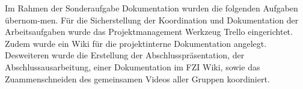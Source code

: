 Im Rahmen der Sonderaufgabe Dokumentation wurden die folgenden Aufgaben übernom-men. Für die Sicherstellung der Koordination und Dokumentation der Arbeitsaufgaben wurde das Projektmanagement Werkzeug Trello eingerichtet. Zudem wurde ein Wiki für die projektinterne Dokumentation angelegt. Desweiteren wurde die Erstellung der Abschlusspräsentation, der Abschlussausarbeitung, einer Dokumentation im FZI Wiki, sowie das Zuammenschneiden des gemeinsamen Videos aller Gruppen koordiniert.